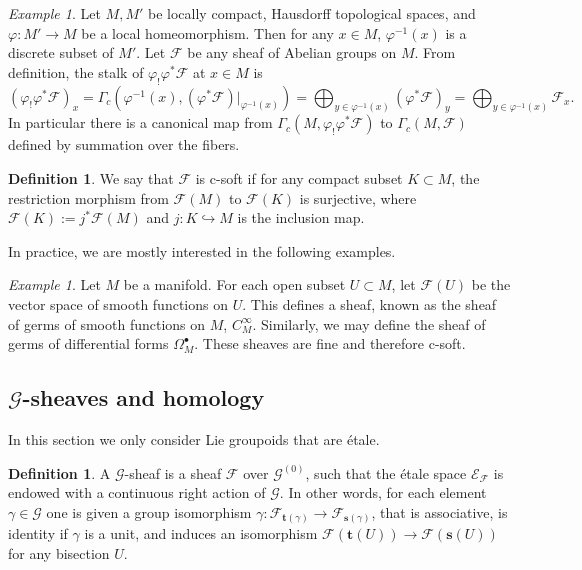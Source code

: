\documentclass[a4paper]{amsart}
\newcommand{\maE}{\mathcal E}
\newcommand{\maF}{\mathcal F}
\newcommand{\maG}{\mathcal G}
\newcommand{\bs}{\mathbf{s}}
\newcommand{\bt}{\mathbf{t}}
\newcommand\<{\langle}
\renewcommand\>{\rangle}
\theoremstyle{definition}
\newtheorem{dfn}[theorem]{Definition}
\theoremstyle{remark}
\newtheorem{ex}[theorem]{Example}
\begin{document}
\begin{ex}
\label{BackForwardSheaf}
Let $M, M'$ be locally compact, Hausdorff topological spaces, and $\varphi : M' \to M$ be a local homeomorphism.
Then for any $x \in M$, $\varphi ^{-1} (x)$ is a discrete subset of $M'$.
Let $\maF$ be any sheaf of Abelian groups on $M$.
From definition, the stalk of $\varphi _! \varphi ^* \maF$ at $x \in M$ is
$$ (\varphi _! \varphi ^* \maF) _x = \Gamma_c (\varphi^{-1} (x), (\varphi^* \maF) \vert _{\varphi^{-1}(x)})
= \bigoplus _{y \in \varphi ^{-1} (x)} (\varphi^* \maF)_y = \bigoplus _{y \in \varphi ^{-1} (x)} \maF _x .$$
In particular there is a canonical map from $\Gamma _c (M, \varphi _! \varphi ^* \maF) $ to $\Gamma _c (M, \maF)$
defined by summation over the fibers.
\end{ex}

\begin{dfn}
We say that $\maF$ is c-soft if for any compact subset $K \subset M$,
the restriction morphism from $\maF (M)$ to $\maF (K)$ is surjective,
where $\maF(K):=j^* \maF(M)$ and $j:K \hookrightarrow M$ is the inclusion map.
\end{dfn}

In practice, we are mostly interested in the following examples.
\begin{ex}
Let $M$ be a manifold. For each open subset $U \subset M$, let $\maF (U)$ be the
vector space of smooth functions on $U$.
This defines a sheaf, known as the sheaf of germs of smooth functions on $M$, $C^\infty _M$.
Similarly, we may define the sheaf of germs of differential forms $\Omega^\bullet _M$.
These sheaves are fine and therefore c-soft.
\end{ex}

\subsection{$\maG$-sheaves and homology}
In this section we only consider Lie groupoids that are \'etale.

\begin{dfn}
A $\maG$-sheaf is a sheaf $\maF$ over $\maG^{(0)}$,
such that the \'etale space $\maE _\maF$ is
endowed with a continuous right action of $\maG$.
In other words, for each element $\gamma \in \maG$
one is given a group isomorphism $\gamma : \maF _{\bt(\gamma)} \to \maF _{\bs(\gamma)}$, that is associative,
is identity if $\gamma$ is a unit, and induces an isomorphism $\maF (\bt(U)) \to \maF (\bs(U))$ for any bisection $U$.
\end{dfn}
\end{document}
